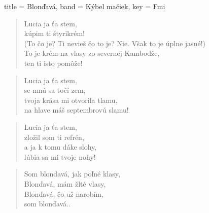\documentclass[a4paper]{article}
\begin{document}
\begin{song}[
    remember-chords = true ,
    verse/numbered = true ,
    transpose-capo = true 
  ]{
    title = Blonďavá,
    band = Kýbel mačiek,
    key  = Fmi
  }
    \begin{verse}
        Lucia ja ťa stem, \\
        kúpim ti štyrikrém! \\
        (To čo je? Ti nevieš čo to je? Nie. Však to je úplne jasné!) \\
        To je krém na vlasy zo severnej Kambodže, \\
        ten ti isto pomôže! 
    \end{verse}
    
    \begin{chorus}
    \end{chorus}
    
    \begin{verse}
        Lucia ja ťa stem, \\
        se mnú sa točí zem, \\
        tvoja krása mi otvorila tlamu, \\
        na hlave máš septembrovú slamu!
    \end{verse}
    
    \begin{verse}
        Lucia ja ťa stem, \\
        zložil som ti refrén, \\
        a ja k tomu dáke slohy, \\
        lúbia sa mi tvoje nohy!
    \end{verse}
    
    \begin{chorus}
    \end{chorus}
    
    \begin{verse}
        Som blondavá, jak poľné klasy, \\
        Blonďavá, mám žlté vlasy, \\
        Blonďavá, čo už narobím, \\
        som blonďavá..
    \end{verse}
    
\end{song}
\end{document}
